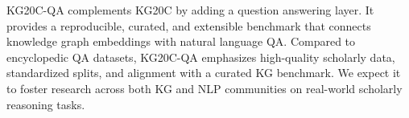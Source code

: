 \documentclass[conference]{IEEEtran}
\begin{document}
KG20C-QA complements KG20C by adding a question answering layer. It provides a reproducible, curated, and extensible benchmark that connects knowledge graph embeddings with natural language QA. Compared to encyclopedic QA datasets, KG20C-QA emphasizes high-quality scholarly data, standardized splits, and alignment with a curated KG benchmark. We expect it to foster research across both KG and NLP communities on real-world scholarly reasoning tasks.


%
%
%
\end{document}
